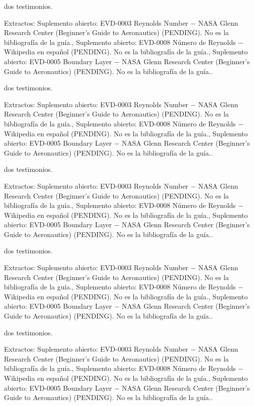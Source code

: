 \documentclass{book}
\begin{document}
\noindent dos testimonios.

\noindent Extractos: Suplemento abierto: EVD-0003 Reynolds Number \(-\) NASA Glenn Research Center (Beginner's Guide to Aeronautics) (PENDING). No es la bibliografía de la guía., Suplemento abierto: EVD-0008 Número de Reynolds \(-\) Wikipedia en español (PENDING). No es la bibliografía de la guía., Suplemento abierto: EVD-0005 Boundary Layer \(-\) NASA Glenn Research Center (Beginner's Guide to Aeronautics) (PENDING). No es la bibliografía de la guía..

\noindent dos testimonios.

\noindent Extractos: Suplemento abierto: EVD-0003 Reynolds Number \(-\) NASA Glenn Research Center (Beginner's Guide to Aeronautics) (PENDING). No es la bibliografía de la guía., Suplemento abierto: EVD-0008 Número de Reynolds \(-\) Wikipedia en español (PENDING). No es la bibliografía de la guía., Suplemento abierto: EVD-0005 Boundary Layer \(-\) NASA Glenn Research Center (Beginner's Guide to Aeronautics) (PENDING). No es la bibliografía de la guía..

\noindent dos testimonios.

\noindent Extractos: Suplemento abierto: EVD-0003 Reynolds Number \(-\) NASA Glenn Research Center (Beginner's Guide to Aeronautics) (PENDING). No es la bibliografía de la guía., Suplemento abierto: EVD-0008 Número de Reynolds \(-\) Wikipedia en español (PENDING). No es la bibliografía de la guía., Suplemento abierto: EVD-0005 Boundary Layer \(-\) NASA Glenn Research Center (Beginner's Guide to Aeronautics) (PENDING). No es la bibliografía de la guía..

\noindent dos testimonios.

\noindent Extractos: Suplemento abierto: EVD-0003 Reynolds Number \(-\) NASA Glenn Research Center (Beginner's Guide to Aeronautics) (PENDING). No es la bibliografía de la guía., Suplemento abierto: EVD-0008 Número de Reynolds \(-\) Wikipedia en español (PENDING). No es la bibliografía de la guía., Suplemento abierto: EVD-0005 Boundary Layer \(-\) NASA Glenn Research Center (Beginner's Guide to Aeronautics) (PENDING). No es la bibliografía de la guía..

\noindent dos testimonios.

\noindent Extractos: Suplemento abierto: EVD-0003 Reynolds Number \(-\) NASA Glenn Research Center (Beginner's Guide to Aeronautics) (PENDING). No es la bibliografía de la guía., Suplemento abierto: EVD-0008 Número de Reynolds \(-\) Wikipedia en español (PENDING). No es la bibliografía de la guía., Suplemento abierto: EVD-0005 Boundary Layer \(-\) NASA Glenn Research Center (Beginner's Guide to Aeronautics) (PENDING). No es la bibliografía de la guía..
\end{document}
